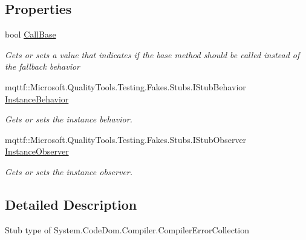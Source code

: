 \subsection*{Properties}
\begin{DoxyCompactItemize}
\item 
bool \hyperlink{class_system_1_1_code_dom_1_1_compiler_1_1_fakes_1_1_stub_compiler_error_collection_a0de4fc3e35837c86a264efb1c83701e0}{Call\-Base}
\begin{DoxyCompactList}\small\item\em Gets or sets a value that indicates if the base method should be called instead of the fallback behavior\end{DoxyCompactList}\item 
mqttf\-::\-Microsoft.\-Quality\-Tools.\-Testing.\-Fakes.\-Stubs.\-I\-Stub\-Behavior \hyperlink{class_system_1_1_code_dom_1_1_compiler_1_1_fakes_1_1_stub_compiler_error_collection_a7ed602150ba0a4a5e44d698b7b7f6e53}{Instance\-Behavior}
\begin{DoxyCompactList}\small\item\em Gets or sets the instance behavior.\end{DoxyCompactList}\item 
mqttf\-::\-Microsoft.\-Quality\-Tools.\-Testing.\-Fakes.\-Stubs.\-I\-Stub\-Observer \hyperlink{class_system_1_1_code_dom_1_1_compiler_1_1_fakes_1_1_stub_compiler_error_collection_a6ef6467c67d7f6d6e4b3269fe31c3964}{Instance\-Observer}
\begin{DoxyCompactList}\small\item\em Gets or sets the instance observer.\end{DoxyCompactList}\end{DoxyCompactItemize}


\subsection{Detailed Description}
Stub type of System.\-Code\-Dom.\-Compiler.\-Compiler\-Error\-Collection



